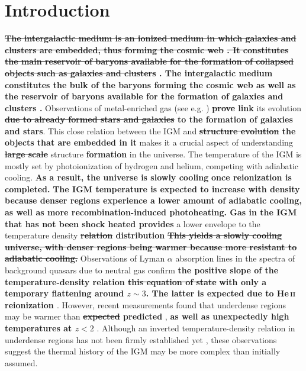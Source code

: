 \documentclass[twocolumns]{emulateapj}
\newcommand\Cc[1]{{\color{blue} \bf #1}} %
\newcommand\Ec[1]{{\color{magenta} \bf #1}} %
\begin{document}
\section{Introduction}
\Ec{\sout{The intergalactic medium is an ionized medium in which galaxies and clusters are embedded, thus forming the cosmic web} \citep{1996Natur.380..603B}\sout{. It constitutes the main reservoir of baryons available for the formation of collapsed objects such as galaxies and clusters} \citep{1997ApJ...489....7R}. The intergalactic medium constitutes the bulk of the baryons forming the cosmic web \citep{1996Natur.380..603B} as well as the reservoir of baryons available for the formation of galaxies and clusters \citep{1997ApJ...489....7R}.} Observations of metal-enriched gas (see e.g. \citet{2009A&A...493..409S,2010MNRAS.407.2063W}) \Ec{\sout{prove} link} its evolution \Ec{\sout{due to already formed stars and galaxies} to the formation of galaxies and stars}. This close relation between the IGM and \Ec{\sout{structure evolution} the objects that are embedded in it} makes it a crucial aspect of understanding \Ec{\sout{large scale}} structure \Ec{formation} in the universe.
The temperature of the IGM is mostly set by photoionization of hydrogen and helium, competing with adiabatic cooling. \Cc{As a result, the universe is slowly cooling} \Ec{once reionization is completed.} \Ec{The IGM temperature is expected to increase with density because denser regions experience a lower amount of adiabatic cooling, as well as more recombination-induced photoheating. Gas in the IGM that has not been shock heated provides} a lower envelope to the temperature density \Ec{\sout{relation} distribution} \Cc{\sout{This yields a slowly cooling universe, with denser regions being warmer because more resistant to adiabatic cooling.}} Observations of Lyman $\alpha$ absorption lines in the spectra of background quasars due to neutral gas confirm \Ec{the positive slope of the temperature-density relation \sout{this equation of state}} \citep{2000MNRAS.318..817S,2000ApJ...534...41R,2012ApJ...757L..30R} \Ec{with only a temporary flattening around $z\sim3$. The latter is expected due to He\,\textsc{ii} reionization \citep[e.g.][]{2009ApJ...694..842M,2013MNRAS.435.3169C,2014arXiv1410.1531P}}. However, recent measurements found that underdense regions may be warmer than \Ec{\sout{expected} predicted} \citep{2009MNRAS.399L..39V,2008MNRAS.386.1131B}, \Ec{as well as unexpectedly high temperatures at $z<2$} \citep{2014MNRAS.441.1916B}. Although an inverted temperature-density relation in underdense regions has not been firmly established yet \citep{2014MNRAS.438.2499B}, these observations suggest the thermal history of the IGM may be more complex than initially assumed.
\end{document}
